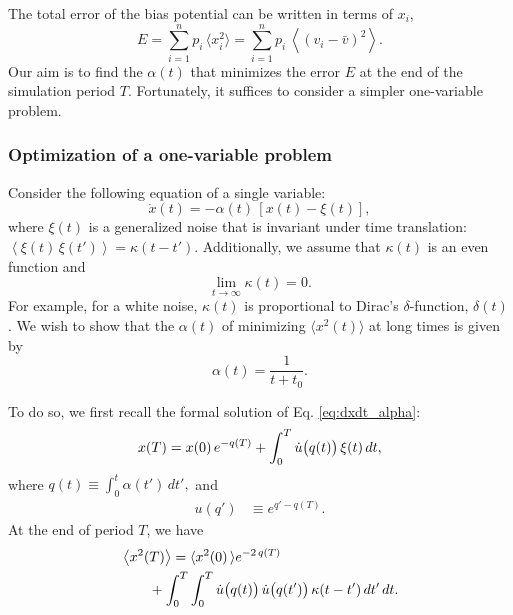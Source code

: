 \documentclass[reprint, floatfix]{revtex4-1}
\newcommand{\Err}{E}
\begin{document}
The total error of the bias potential can be written in
terms of $x_i$,
\begin{equation}
  \Err
  =
  \sum_{i = 1}^n p_i \, \langle x_i^2 \rangle
  =
  \sum_{i = 1}^n p_i \, \left\langle (v_i - \bar v)^2 \right\rangle
  .
\label{eq:error_sum}
\end{equation}
%
Our aim is to find the $\alpha(t)$
that minimizes the error $E$
at the end of the simulation period $T$.
%
Fortunately, it suffices to consider
a simpler one-variable problem.



\subsubsection{Optimization of a one-variable problem}



Consider the following equation
of a single variable:
%
\begin{equation}
\dot x(t) = -\alpha(t) \, \left[ x(t) - \xi(t) \right],
\label{eq:dxdt_alpha}
\end{equation}
%
where $\xi(t)$ is a generalized noise
that is invariant under time translation:
%
$
  \left\langle \xi(t) \, \xi(t') \right\rangle
  =
  \kappa(t - t')
  .
$
%
Additionally,
we assume that $\kappa(t)$ is an even function and
\begin{equation}
  \lim_{t \rightarrow \infty} \kappa(t)
  = 0
  .
  \label{eq:kappa_limit}
\end{equation}
%
For example, for a white noise,
$\kappa(t)$ is proportional to
Dirac's $\delta$-function, $\delta(t)$.
%
We wish to show that the $\alpha(t)$
of minimizing $\langle x^2(t) \rangle$ at long times
is given by
%
\begin{equation}
  \alpha(t) = \frac{ 1 }{ t + t_0 }.
\label{eq:alpha_invt1}
\end{equation}



To do so, we first recall
the formal solution of Eq. \eqref{eq:dxdt_alpha}:
%
\begin{equation}
x(T)
=
x(0) \, e^{-q(T)}
+
\int_0^T
  \dot u\bigl( q(t) \bigr) \, \xi(t) \, dt,
\notag
\end{equation}
%
where
%
$
q(t) \equiv \int_0^t \alpha(t') \, dt',
$
%
and
%
\begin{align}
u(q')
&\equiv
e^{q' - q(T)}.
\label{eq:u_def}
\end{align}
At the end of period $T$, we have
\begin{align}
&\left\langle x^2(T) \right\rangle
=
\langle x^2(0) \,
\rangle e^{-2 \, q(T)}
\notag
\\
&\qquad
+
\int_0^T \int_0^T
  \dot u\bigl( q(t) \bigr) \,
  \dot u\bigl( q(t') \bigr) \,
  \kappa(t - t') \, dt' \, dt.
\label{eq:x2t_average}
\end{align}
\end{document}
